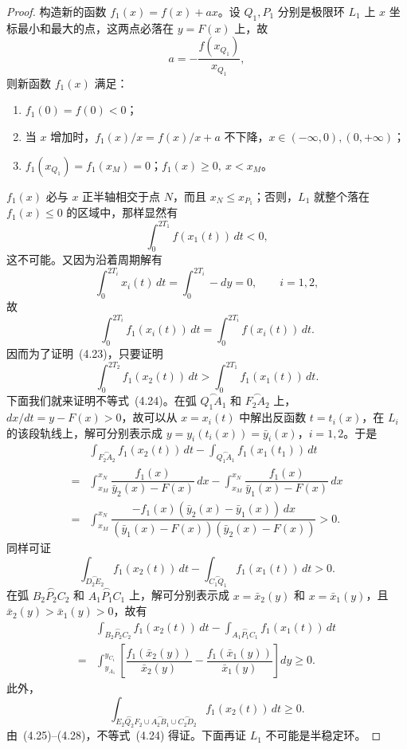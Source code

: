 \begin{proof}
构造新的函数 $f_1(x)=f(x)+ax$。设 $Q_1,P_1$ 分别是极限环 $L_1$ 上 $x$ 坐标最小和最大的点，这两点必落在 $y=F(x)$ 上，故
\[
a=-\dfrac{f(x_{Q_1})}{x_{Q_1}},
\]
则新函数 $f_1(x)$ 满足：
\begin{enumerate}
\item $f_1(0)=f(0)<0$；
\item 当 $x$ 增加时，$f_1(x)/x=f(x)/x+a$ 不下降，$x\in(-\infty,0),(0,+\infty)$；
\item $f_1(x_{Q_1})=f_1(x_M)=0$；$f_1(x)\geq0,\ x<x_M$。
\end{enumerate}
$f_1(x)$ 必与 $x$ 正半轴相交于点 $N$，而且 $x_N\leq x_{P_1}$；否则，$L_1$ 就整个落在 $f_1(x)\leq0$ 的区域中，那样显然有
\[
\int_0^{2T_1}f(x_1(t))\,dt<0,
\]
这不可能。又因为沿着周期解有
\[
\int_0^{2T_i}x_i(t)\,dt=\int_0^{2T_i}-dy=0,\qquad i=1,2,
\]
故
\[
\int_0^{2T_i}f_1(x_i(t))\,dt
=\int_0^{2T_i}f(x_i(t))\,dt.
\]
因而为了证明~(4.23)，只要证明
\[
\int_0^{2T_2}f_1(x_2(t))\,dt>
\int_0^{2T_1}f_1(x_1(t))\,dt. \tag{4.24}
\]
下面我们就来证明不等式~(4.24)。在弧 $\overset{\frown}{Q_1A_1}$ 和 $\overset{\frown}{F_2A_2}$ 上，$dx/dt=y-F(x)>0$，故可以从 $x=x_i(t)$ 中解出反函数 $t=t_i(x)$，在 $L_i$ 的该段轨线上，解可分别表示成 $y=y_i(t_i(x))=\bar y_i(x)$，$i=1,2$。于是
\[
\begin{aligned}
&\int_{\overset{\frown}{F_2A_2}}f_1(x_2(t))\,dt-
\int_{\overset{\frown}{Q_1A_1}}f_1(x_1(t_1))\,dt\\
={}&\int_{x_M}^{x_N}\dfrac{f_1(x)}{\bar y_2(x)-F(x)}\,dx-
\int_{x_M}^{x_N}\dfrac{f_1(x)}{\bar y_1(x)-F(x)}\,dx\\
={}&\int_{x_M}^{x_N}
\dfrac{-f_1(x)(\bar y_2(x)-\bar y_1(x))\,dx}
{(\bar y_1(x)-F(x))(\bar y_2(x)-F(x))}>0.
\end{aligned}
\]
同样可证
\[
\int_{\overset{\frown}{D_2E_2}}f_1(x_2(t))\,dt-
\int_{\overset{\frown}{C_1Q_1}}f_1(x_1(t))\,dt>0. \tag{4.26}
\]
在弧 $\overset{\frown}{B_2P_2C_2}$ 和 $\overset{\frown}{A_1P_1C_1}$ 上，解可分别表示成 $x=\bar x_2(y)$ 和 $x=\bar x_1(y)$，且 $\bar x_2(y)>\bar x_1(y)>0$，故有
\[
\begin{aligned}
&\int_{\overset{\frown}{B_2P_2C_2}}f_1(x_2(t))\,dt-
\int_{\overset{\frown}{A_1P_1C_1}}f_1(x_1(t))\,dt\\
={}&\int_{y_{A_1}}^{y_{C_1}}
\left[\dfrac{f_1(\bar x_2(y))}{\bar x_2(y)}-
\dfrac{f_1(\bar x_1(y))}{\bar x_1(y)}\right]dy\geq0.
\end{aligned}
\]
此外，
\[
\int_{\overset{\frown}{E_2Q_2F_2}\cup\overset{\frown}{A_2B_1}\cup\overset{\frown}{C_2D_2}}
f_1(x_2(t))\,dt\geq0. \tag{4.28}
\]
由~(4.25)--(4.28)，不等式~(4.24) 得证。下面再证 $L_1$ 不可能是半稳定环。


\end{proof}

